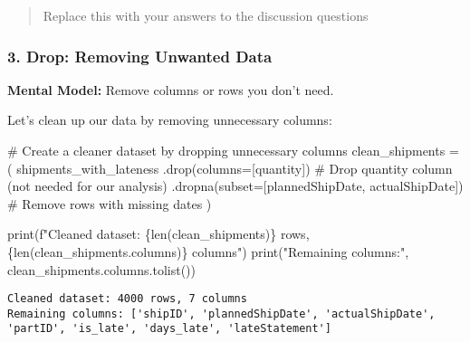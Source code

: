 \documentclass[
  letterpaper,
  DIV=11,
  numbers=noendperiod]{scrartcl}
\newenvironment{Shaded}{\begin{snugshade}}{\end{snugshade}}
\newcommand{\BuiltInTok}[1]{\textcolor[rgb]{0.00,0.23,0.31}{#1}}
\newcommand{\CommentTok}[1]{\textcolor[rgb]{0.37,0.37,0.37}{#1}}
\newcommand{\NormalTok}[1]{\textcolor[rgb]{0.00,0.23,0.31}{#1}}
\newcommand{\OperatorTok}[1]{\textcolor[rgb]{0.37,0.37,0.37}{#1}}
\newcommand{\SpecialCharTok}[1]{\textcolor[rgb]{0.37,0.37,0.37}{#1}}
\newcommand{\SpecialStringTok}[1]{\textcolor[rgb]{0.13,0.47,0.30}{#1}}
\newcommand{\StringTok}[1]{\textcolor[rgb]{0.13,0.47,0.30}{#1}}
\begin{document}
\begin{quote}
Replace this with your answers to the discussion questions
\end{quote}

\subsubsection{3. Drop: Removing Unwanted
Data}\label{drop-removing-unwanted-data}

\textbf{Mental Model:} Remove columns or rows you don't need.

Let's clean up our data by removing unnecessary columns:

\label{mental-model-3-drop}
\begin{Shaded}
\begin{Highlighting}[]
\CommentTok{\# Create a cleaner dataset by dropping unnecessary columns}
\NormalTok{clean\_shipments }\OperatorTok{=}\NormalTok{ (}
\NormalTok{    shipments\_with\_lateness}
\NormalTok{    .drop(columns}\OperatorTok{=}\NormalTok{[}\StringTok{\textquotesingle{}quantity\textquotesingle{}}\NormalTok{])  }\CommentTok{\# Drop quantity column (not needed for our analysis)}
\NormalTok{    .dropna(subset}\OperatorTok{=}\NormalTok{[}\StringTok{\textquotesingle{}plannedShipDate\textquotesingle{}}\NormalTok{, }\StringTok{\textquotesingle{}actualShipDate\textquotesingle{}}\NormalTok{])  }\CommentTok{\# Remove rows with missing dates}
\NormalTok{)}

\BuiltInTok{print}\NormalTok{(}\SpecialStringTok{f"Cleaned dataset: }\SpecialCharTok{\{}\BuiltInTok{len}\NormalTok{(clean\_shipments)}\SpecialCharTok{\}}\SpecialStringTok{ rows, }\SpecialCharTok{\{}\BuiltInTok{len}\NormalTok{(clean\_shipments.columns)}\SpecialCharTok{\}}\SpecialStringTok{ columns"}\NormalTok{)}
\BuiltInTok{print}\NormalTok{(}\StringTok{"Remaining columns:"}\NormalTok{, clean\_shipments.columns.tolist())}
\end{Highlighting}
\end{Shaded}

\begin{verbatim}
Cleaned dataset: 4000 rows, 7 columns
Remaining columns: ['shipID', 'plannedShipDate', 'actualShipDate', 'partID', 'is_late', 'days_late', 'lateStatement']
\end{verbatim}
\end{document}
